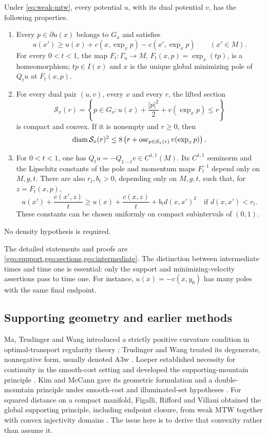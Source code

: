 \begin{theorem}
\label{thm:foundation}
Under \eqref{eq:weak-mtw}, every potential $u$, with its dual potential $v$,
has the following properties.
\begin{enumerate}[label=\textup{(\roman*)}]
\item Every $p\in\partial u(x)$ belongs to $G_x$ and satisfies
\[
 u(x')\geq u(x)+c(x,\exp_xp)-c(x',\exp_xp)
 \qquad(x'\in M).
\]
For every $0<t<1$, the map $F_t:\Gamma_u\to M$,
$F_t(x,p)=\exp_x(tp)$, is a homeomorphism; $tp\in I(x)$ and $x$
is the unique global minimizing pole of $Q_tu$ at $F_t(x,p)$.
\item For every dual pair $(u,v)$, every $x$ and every $r$, the lifted section
\[
 \mathcal S_x(r)=\left\{p\in G_x:
 u(x)+\frac{|p|^2}{2}+v(\exp_xp)\leq r\right\}
\]
is compact and convex. If it is nonempty and $r\geq0$, then
\[
 \operatorname{diam}\mathcal S_x(r)^2
 \leq8\left(r+\operatorname{osc}_{p\in\mathcal S_x(r)}v(\exp_xp)\right).
\]
\item For $0<t<1$, one has $Q_tu=-Q_{1-t}v\in C^{1,1}(M)$.
Its $C^{1,1}$ seminorm and the Lipschitz constants of the pole and momentum
maps $F_t^{-1}$ depend only on $M,g,t$. There are also $r_t,b_t>0$,
depending only on $M,g,t$, such that, for $z=F_t(x,p)$,
\[
 u(x')+\frac{c(x',z)}t
 \geq u(x)+\frac{c(x,z)}t+b_t d(x,x')^2
 \quad\text{if }d(x,x')<r_t.
\]
These constants can be chosen uniformly on compact subintervals of $(0,1)$.
\end{enumerate}
No density hypothesis is required.
\end{theorem}

The detailed statements and proofs are \cref{geo:support,geo:sections,geo:intermediate}.
The distinction between intermediate times and time one is essential:
only the support and minimizing-velocity assertions pass to time one.
For instance, $u(x)=-c(x,y_0)$ has many poles with the same final endpoint.

\subsection{Supporting geometry and earlier methods}

Ma, Trudinger and Wang introduced a strictly positive curvature condition
in optimal-transport regularity theory \cite{MTW2005}; Trudinger and Wang
treated its degenerate, nonnegative form, usually denoted A3w
\cite[Section~1]{TW2009}. Loeper established necessity for continuity in
the smooth-cost setting and developed the supporting-mountain principle
\cite{Loeper2009}. Kim and McCann gave its geometric formulation and a
double-mountain principle under smooth-cost and illuminated-set
hypotheses \cite[Theorem~4.10]{KM2010}. For squared distance on a compact
manifold, Figalli, Rifford and Villani obtained the global supporting
principle, including endpoint closure, from weak MTW together with convex
injectivity domains \cite[Lemma~3.1]{FRV2011}. The issue here is to derive
that convexity rather than assume it.

